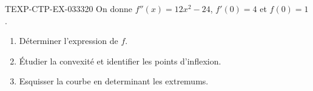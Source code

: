 \begin{exercice}{TEXP-CTP-EX-033}{3}{20}
On donne $f''(x) = 12x^2 - 24$, $f'(0) = 4$ et $f(0) = 1$.
\begin{enumerate}
  \item Déterminer l'expression de $f$.
  \item Étudier la convexité et identifier les points d'inflexion.
  \item Esquisser la courbe en determinant les extremums.
\end{enumerate}

\end{exercice}
